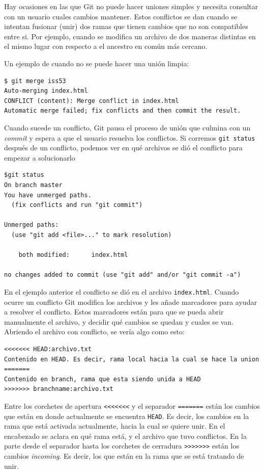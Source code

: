 Hay ocasiones en las que Git no puede hacer uniones simples y necesita
consultar con un usuario cuales cambios mantener. Estos conflictos se
dan cuando se intentan fusionar (unir) dos ramas que tienen cambios que
no son compatibles entre si. Por ejemplo, cuando se modifica un archivo
de dos maneras distintas en el mismo lugar con respecto a el ancestro en
común más cercano.

Un ejemplo de cuando no se puede hacer una unión limpia:

\begin{lstlisting}
$ git merge iss53
Auto-merging index.html
CONFLICT (content): Merge conflict in index.html
Automatic merge failed; fix conflicts and then commit the result.
\end{lstlisting}

Cuando sucede un conflicto, Git pausa el proceso de unión que culmina
con un \emph{commit} y espera a que el usuario resuelva los conflictos.
Si corremos \passthrough{\lstinline!git status!} después de un
conflicto, podemos ver en qué archivos se dió el conflicto para empezar
a solucionarlo

\begin{lstlisting}
$git status
On branch master
You have unmerged paths.
  (fix conflicts and run "git commit")

Unmerged paths:
  (use "git add <file>..." to mark resolution)

    both modified:      index.html

no changes added to commit (use "git add" and/or "git commit -a")
\end{lstlisting}

En el ejemplo anterior el conflicto se dió en el archivo
\passthrough{\lstinline!index.html!}. Cuando ocurre un conflicto Git
modifica los archivos y les añade marcadores para ayudar a resolver el
conflicto. Estos marcadores están para que se pueda abrir manualmente el
archivo, y decidir qué cambios se quedan y cuales se van. Abriendo el
archivo con conflicto, se vería algo como esto:

\begin{lstlisting}
<<<<<<< HEAD:archivo.txt
Contenido en HEAD. Es decir, rama local hacia la cual se hace la union
=======
Contenido en branch, rama que esta siendo unida a HEAD
>>>>>>> branchname:archivo.txt
\end{lstlisting}

Entre los corchetes de apertura \passthrough{\lstinline!<<<<<<<!} y el
separador \passthrough{\lstinline!=======!} están los cambios que están
en donde actualmente se encuentra \passthrough{\lstinline!HEAD!}. Es
decir, los cambios en la rama que está activada actualmente, hacia la
cual se quiere unir. En el encabezado se aclara en qué rama está, y el
archivo que tuvo conflictos. En la parte desde el separador hasta los
corchetes de cerradura \passthrough{\lstinline!>>>>>>>!} están los
cambios \emph{incoming}. Es decir, los que están en la rama que se está
tratando de unir.

